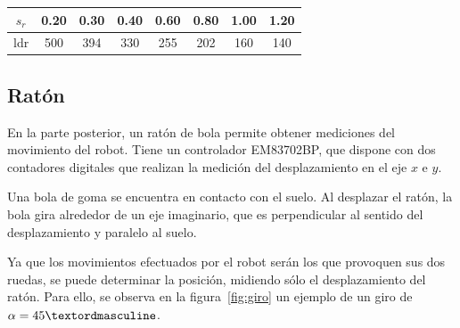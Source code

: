 \documentclass[10pt,a4paper,hidelinks]{article}
\begin{document}
\begin{multicols}{2}
\begin{center}
\begin{tabular}{ *{8}{|c} | }
\hline
$s_{r}$ & 0.20 & 0.30 & 0.40 & 0.60 & 0.80 & 1.00 & 1.20 \\ \hline
ldr & 500 & 394 & 330 & 255 & 202 & 160 & 140 \\ \hline
\end{tabular}
\end{center}

\subsection{Ratón}

En la parte posterior, un ratón de bola permite obtener mediciones del movimiento del
robot. Tiene un controlador EM83702BP, que dispone con dos contadores digitales que
realizan la medición del desplazamiento en el eje $x$ e $y$.

Una bola de goma se encuentra en contacto con el suelo. Al desplazar el ratón, 
la bola gira alrededor de un eje imaginario, que es perpendicular al sentido del
desplazamiento y paralelo al suelo.

Ya que los movimientos efectuados por el robot serán los que provoquen sus dos ruedas,
se puede determinar la posición, midiendo sólo el desplazamiento del ratón. Para ello,
se observa en la figura~\ref{fig:giro} un ejemplo de un giro de $\alpha = \RobotAngleº$.

\begin{center}
\end{center}
\end{multicols}
\end{document}
